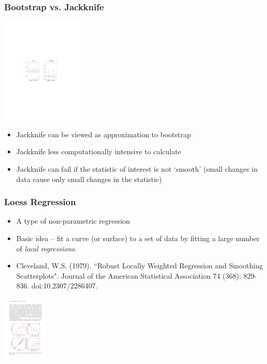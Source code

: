 \documentclass{beamer}
\begin{document}
\begin{frame}
  \frametitle{Bootstrap vs. Jackknife}

\begin{center}
\includegraphics[height=2in]{jack-vs-boot}
\end{center}

\begin{itemize}
    \item Jackknife can be viewed as approximation to bootstrap
    \item Jackknife less computationally intensive to calculate
    \item Jackknife can fail if the statistic of interest is not `smooth' (small changes in data cause only small changes in the statistic) 
\end{itemize}    

\end{frame}

\begin{frame}
  \frametitle{Loess Regression}
  
\begin{itemize}
    \item A type of non-parametric regression
    \item Basic idea -- fit a curve (or surface) to a set of data by fitting a large number of \emph{local regressions}.
    \item Cleveland, W.S. (1979). ``Robust Locally Weighted Regression and Smoothing Scatterplots". Journal of the American Statistical Association 74 (368): 829-836. doi:10.2307/2286407.
\end{itemize}

\begin{center}
\includegraphics[height=1.25in]{loess-example.pdf}
\end{center}  


\end{frame}
\end{document}
